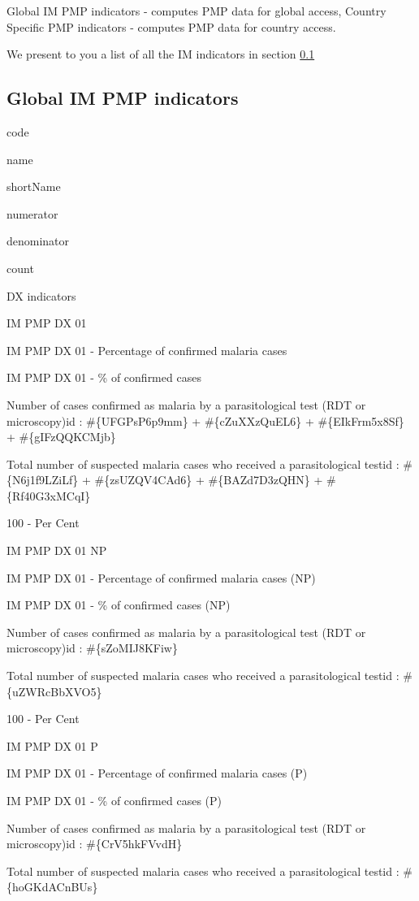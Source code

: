 \documentclass[]{book}
\begin{document}
Global IM PMP indicators - computes PMP data for global access,
Country Specific PMP indicators - computes PMP data for country access.

We present to you a list of all the IM indicators in section \ref{global-ind}

\hypertarget{global-ind}{%
\subsection{Global IM PMP indicators}\label{global-ind}}

code

name

shortName

numerator

denominator

count

DX indicators

IM PMP DX 01

IM PMP DX 01 - Percentage of confirmed malaria cases

IM PMP DX 01 - \% of confirmed cases

Number of cases confirmed as malaria by a parasitological test (RDT or microscopy)id : \#\{UFGPsP6p9mm\} + \#\{cZuXXzQuEL6\} + \#\{EIkFrm5x8Sf\} + \#\{gIFzQQKCMjb\}

Total number of suspected malaria cases who received a parasitological testid : \#\{N6j1f9LZiLf\} + \#\{zsUZQV4CAd6\} + \#\{BAZd7D3zQHN\} + \#\{Rf40G3xMCqI\}

100 - Per Cent

IM PMP DX 01 NP

IM PMP DX 01 - Percentage of confirmed malaria cases (NP)

IM PMP DX 01 - \% of confirmed cases (NP)

Number of cases confirmed as malaria by a parasitological test (RDT or microscopy)id : \#\{sZoMIJ8KFiw\}

Total number of suspected malaria cases who received a parasitological testid : \#\{uZWRcBbXVO5\}

100 - Per Cent

IM PMP DX 01 P

IM PMP DX 01 - Percentage of confirmed malaria cases (P)

IM PMP DX 01 - \% of confirmed cases (P)

Number of cases confirmed as malaria by a parasitological test (RDT or microscopy)id : \#\{CrV5hkFVvdH\}

Total number of suspected malaria cases who received a parasitological testid : \#\{hoGKdACnBUs\}
\end{document}

